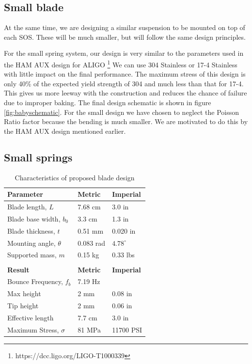 \subsection{Small blade}

At the same time, we are designing a similar suspension to be mounted on top of each SOS.  These will be much smaller, but will follow the same design principles.


For the small spring system, our design is very similar to the parameters used in the HAM AUX design for ALIGO \footnote{https://dcc.ligo.org/LIGO-T1000339}  We can use 304 Stainless or 17-4 Stainless with little impact on the final performance.  The maximum stress of this design is only 40\% of the expected yield strength of 304 and much less than that for 17-4.  This gives us more leeway with the construction and reduces the chance of failure due to improper baking.  The final design schematic is shown in figure \ref{fig:babyschematic}.  For the small design we have chosen to neglect the Poisson Ratio factor because the bending is much smaller.  We are motivated to do this by the HAM AUX design mentioned earlier.


\subsection{Small springs}

\begin{table}[ht]
\centering
\begin{tabular}{ l | l | l }
\bf{Parameter}& \bf{Metric} & \bf{Imperial} \\ \hline
Blade length, $L$ & 7.68 cm & 3.0 in \\ \hline
Blade base width, $b_0$ & 3.3 cm & 1.3 in \\ \hline
Blade thickness, $t$ & 0.51 mm & 0.020 in \\ \hline
Mounting angle, $\theta$ & 0.083 rad & $4.78^\circ$ \\ \hline
Supported mass, $m$ & 0.15 kg & 0.33 lbs\\\\
\bf{Result} & \bf{Metric} & \bf{Imperial} \\ \hline
Bounce Frequency, $f_b$ & 7.19 Hz \\ \hline
Max height & 2 mm & 0.08 in \\ \hline
Tip height & 2 mm & 0.06 in \\ \hline
Effective length & 7.7 cm & 3.0 in \\ \hline
Maximum Stress, $\sigma$ & 81 MPa & 11700 PSI
\end{tabular}
\caption{Characteristics of proposed blade design}
\label{tab:resultsBaby}
\end{table}

